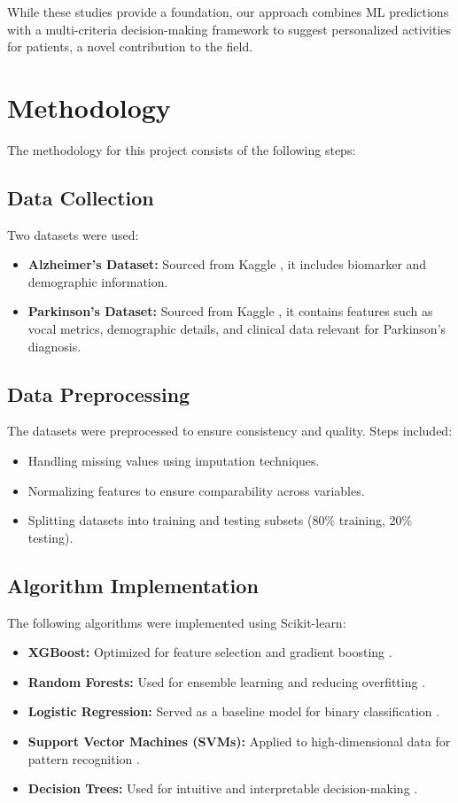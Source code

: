 \documentclass[conference]{IEEEtran}
\begin{document}
While these studies provide a foundation, our approach combines ML predictions with a multi-criteria decision-making framework to suggest personalized activities for patients, a novel contribution to the field.

\section{Methodology}
The methodology for this project consists of the following steps:

\subsection{Data Collection}
Two datasets were used:
\begin{itemize}
    \item \textbf{Alzheimer’s Dataset:} Sourced from Kaggle \cite{b4}, it includes biomarker and demographic information.
    \item \textbf{Parkinson’s Dataset:} Sourced from Kaggle \cite{b6}, it contains features such as vocal metrics, demographic details, and clinical data relevant for Parkinson’s diagnosis.
\end{itemize}

\subsection{Data Preprocessing}
The datasets were preprocessed to ensure consistency and quality. Steps included:
\begin{itemize}
    \item Handling missing values using imputation techniques.
    \item Normalizing features to ensure comparability across variables.
    \item Splitting datasets into training and testing subsets (80\% training, 20\% testing).
\end{itemize}

\subsection{Algorithm Implementation}
The following algorithms were implemented using Scikit-learn:
\begin{itemize}
    \item \textbf{XGBoost:} Optimized for feature selection and gradient boosting \cite{b1}.
    \item \textbf{Random Forests:} Used for ensemble learning and reducing overfitting \cite{b2}.
    \item \textbf{Logistic Regression:} Served as a baseline model for binary classification \cite{b7}.
    \item \textbf{Support Vector Machines (SVMs):} Applied to high-dimensional data for pattern recognition \cite{b3}.
    \item \textbf{Decision Trees:} Used for intuitive and interpretable decision-making \cite{b7}.
\end{itemize}
\end{document}
